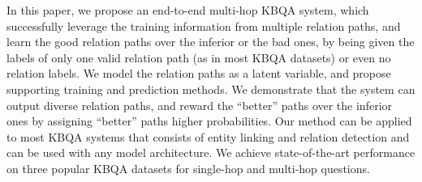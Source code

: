 
In this paper, we propose an end-to-end multi-hop KBQA system, which successfully leverage the training information from multiple relation paths, and learn the good relation paths over the inferior or the bad ones, by being given the labels of only one valid relation path (as in most KBQA datasets) or even no relation labels. We model the relation paths as a latent variable, and propose supporting training and prediction methods. We demonstrate that the system can output diverse relation paths, and reward the ``better'' paths over the inferior ones by assigning ``better'' paths higher probabilities. Our method can be applied to most KBQA systems that consists of entity linking and relation detection and can be used with any model architecture. We achieve state-of-the-art performance on three popular KBQA datasets for single-hop and multi-hop questions.%
